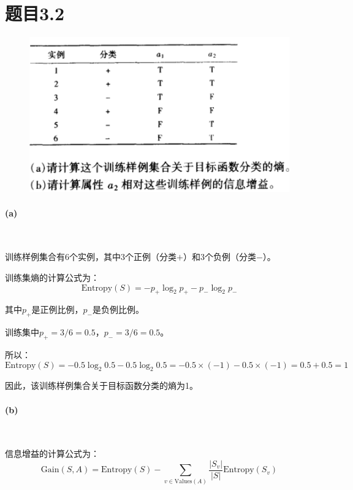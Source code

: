 \documentclass{article}
\begin{document}
\section{题目3.2}

    \begin{figure}[!h]
        \centering
        \includegraphics[width=1.2\linewidth]{image/3.2.png}
        \label{3.2}
    \end{figure}
    
    \paragraph{(a)}~{}
    
    训练样例集合有6个实例，其中3个正例（分类$+$）和3个负例（分类$-$）。  
    
    训练集熵的计算公式为：  
    \[
    \text{Entropy}(S) = -p_+ \log_2 p_+ - p_- \log_2 p_-
    \]  

    其中\(p_+\)是正例比例，\(p_-\)是负例比例。
    
    训练集中\(p_+ = 3/6 = 0.5\)，\(p_- = 3/6 = 0.5\)。
    
    所以：  
    \[
    \text{Entropy}(S) = -0.5 \log_2 0.5 - 0.5 \log_2 0.5 = -0.5 \times (-1) - 0.5 \times (-1) = 0.5 + 0.5 = 1
    \]  
    
    因此，该训练样例集合关于目标函数分类的熵为1。
    

    \paragraph{(b)}~{}

    信息增益的计算公式为：  
    \[
    \text{Gain}(S, A) = \text{Entropy}(S) - \sum_{v \in \text{Values}(A)} \frac{|S_v|}{|S|} \text{Entropy}(S_v)
    \]  
    
\end{document}
